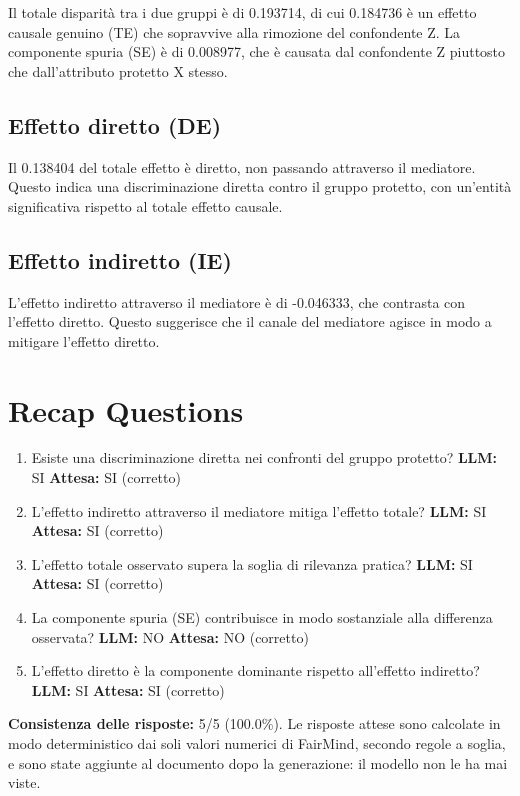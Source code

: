 \documentclass[11pt]{article}
\begin{document}
Il totale disparità tra i due gruppi è di 0.193714, di cui 0.184736 è un effetto causale genuino (TE) che sopravvive alla rimozione del confondente Z. La componente spuria (SE) è di 0.008977, che è causata dal confondente Z piuttosto che dall'attributo protetto X stesso.

\subsection{Effetto diretto (DE)}

Il 0.138404 del totale effetto è diretto, non passando attraverso il mediatore. Questo indica una discriminazione diretta contro il gruppo protetto, con un'entità significativa rispetto al totale effetto causale.

\subsection{Effetto indiretto (IE)}

L'effetto indiretto attraverso il mediatore è di -0.046333, che contrasta con l'effetto diretto. Questo suggerisce che il canale del mediatore agisce in modo a mitigare l'effetto diretto.

\section{Recap Questions}

\begin{enumerate}
\item Esiste una discriminazione diretta nei confronti del gruppo protetto? \textbf{LLM:} SI \quad \textbf{Attesa:} SI \quad (corretto)
\item L'effetto indiretto attraverso il mediatore mitiga l'effetto totale? \textbf{LLM:} SI \quad \textbf{Attesa:} SI \quad (corretto)
\item L'effetto totale osservato supera la soglia di rilevanza pratica? \textbf{LLM:} SI \quad \textbf{Attesa:} SI \quad (corretto)
\item La componente spuria (SE) contribuisce in modo sostanziale alla differenza osservata? \textbf{LLM:} NO \quad \textbf{Attesa:} NO \quad (corretto)
\item L'effetto diretto è la componente dominante rispetto all'effetto indiretto? \textbf{LLM:} SI \quad \textbf{Attesa:} SI \quad (corretto)
\end{enumerate}


\vspace{1em}
\noindent\textbf{Consistenza delle risposte:} 5/5 (100.0\%). Le risposte attese sono calcolate in modo deterministico dai soli valori numerici di FairMind, secondo regole a soglia, e sono state aggiunte al documento dopo la generazione: il modello non le ha mai viste.
\end{document}
